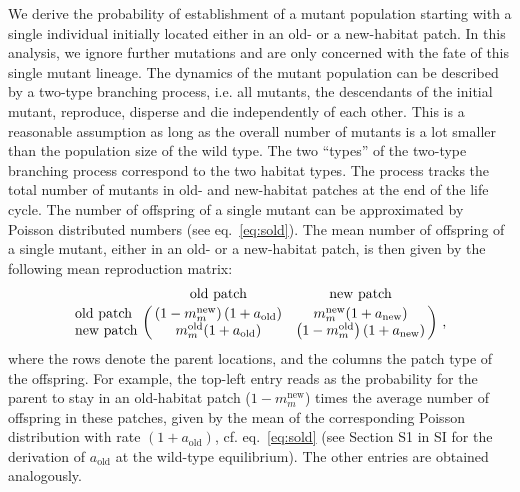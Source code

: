 \documentclass[a4paper,11pt]{article}
\newcommand{\chg}[1]{\textcolor{change}{#1}}
\begin{document}
We derive the probability of establishment of a mutant population starting with a single individual initially located either in an old- or a new-habitat patch. In this analysis, we ignore further mutations and are only concerned with the fate of this single mutant lineage. 
The dynamics of the mutant population can be described by a two-type branching process, i.e. \chg{all mutants, the descendants of the initial mutant, reproduce, disperse and die independently of each other.} This is a reasonable assumption as long as the overall number of mutants is a lot smaller than the population size of the wild type. The two ``types'' of the two-type branching process correspond to the two habitat types. The process tracks the \chg{total number of mutants in old- and new-habitat patches at the end of the life cycle.} The number of offspring of a single mutant can be approximated by Poisson distributed numbers (see eq.~\eqref{eq:sold}). The mean number of offspring of a single mutant, either in an old- or a new-habitat patch, is then given by the following mean reproduction matrix:
%
\begin{equation}\label{eq:mean_repro}
	\bordermatrix{ ~ & \text{old patch} & \text{new patch} \cr
		\text{old patch} & \left(1-m_m^{\text{new}}\right) (1+a_{\text{old}}) & m_m^{\text{new}} (1+a_{\text{new}}) \cr
		\text{new patch} & m_m^{\text{old}} (1+a_{\text{old}}) & \left(1-m_m^{\text{old}}\right) (1+a_{\text{new}})
		}\ ,
\end{equation}
%
where the rows denote the parent locations, and the columns the patch type of the offspring. 
For example, the top-left entry reads as the probability for the parent to stay in an old-habitat patch ($1-m_m^{\text{new}}$) times the average number of offspring in these patches, given by the mean of the corresponding Poisson distribution with rate $(1+a_{\text{old}})$, cf. eq.~\eqref{eq:sold} \chg{(see Section S1 in SI for the derivation of $a_{\text{old}}$ at the wild-type equilibrium)}. The other entries are obtained analogously.
\end{document}
